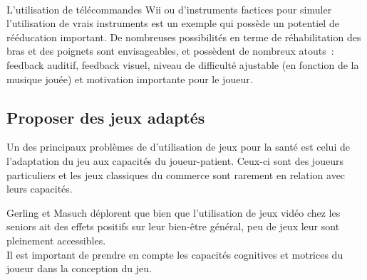 \paragraph{} L'utilisation de télécommandes Wii ou d'instruments factices pour simuler l'utilisation de vrais instruments est un exemple qui possède un potentiel de rééducation important. De nombreuses possibilités en terme de réhabilitation des bras et des poignets sont envisageables, et possèdent de nombreux atouts~: feedback auditif, feedback visuel, niveau de difficulté ajustable (en fonction de la musique jouée) et motivation importante pour le joueur.

		\subsection{Proposer des jeux adaptés}
Un des principaux problèmes de d'utilisation de jeux pour la santé est celui de l'adaptation du jeu aux capacités du joueur-patient\cite{Flor08}. Ceux-ci sont des joueurs particuliers et les jeux classiques du commerce sont rarement en relation avec leurs capacités.

Gerling et Masuch\cite{Gerl11} déplorent que bien que l'utilisation de jeux vidéo chez les seniors ait des effets positifs sur leur bien-être général, peu de jeux leur sont pleinement accessibles.\\
Il est important de prendre en compte les capacités cognitives et motrices du joueur dans la conception du jeu.

